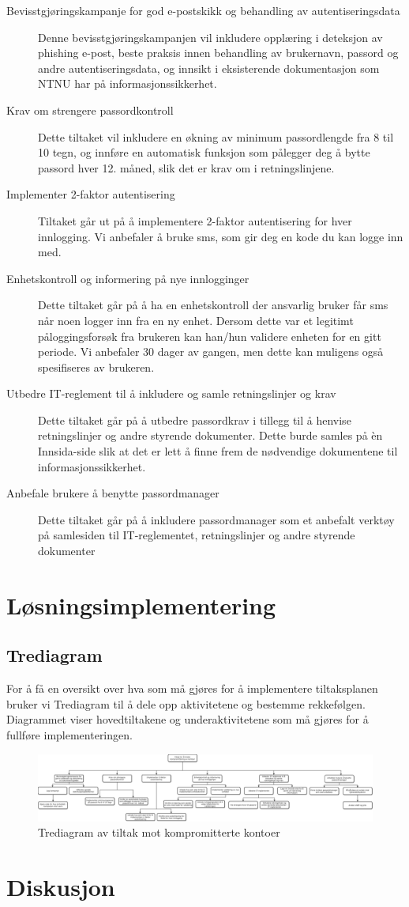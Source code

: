 \begin{description}
    \item[Bevisstgjøringskampanje for god e-postskikk og behandling av autentiseringsdata] Denne bevisstgjøringskampanjen vil inkludere opplæring i deteksjon av phishing e-post, beste praksis innen behandling av brukernavn, passord og andre autentiseringsdata, og innsikt i eksisterende dokumentasjon som NTNU har på informasjonssikkerhet. 
    \item[Krav om strengere passordkontroll] Dette tiltaket vil inkludere en økning av minimum passordlengde fra 8 til 10 tegn, og innføre en automatisk funksjon som pålegger deg å bytte passord hver 12. måned, slik det er krav om i retningslinjene. 
    \item[Implementer 2-faktor autentisering] Tiltaket går ut på å implementere 2-faktor autentisering for hver innlogging. Vi anbefaler å bruke sms, som gir deg en kode du kan logge inn med. 
    \item[Enhetskontroll og informering på nye innlogginger] Dette tiltaket går på å ha en enhetskontroll der ansvarlig bruker får sms når noen logger inn fra en ny enhet. Dersom dette var et legitimt påloggingsforsøk fra brukeren kan han/hun validere enheten for en gitt periode. Vi anbefaler 30 dager av gangen, men dette kan muligens også spesifiseres av brukeren. 
    \item[Utbedre IT-reglement til å inkludere og samle retningslinjer og krav] Dette tiltaket går på å utbedre passordkrav i tillegg til å henvise retningslinjer og andre styrende dokumenter. Dette burde samles på èn Innsida-side slik at det er lett å finne frem de nødvendige dokumentene til informasjonssikkerhet. 
    \item[Anbefale brukere å benytte passordmanager] Dette tiltaket går på å inkludere passordmanager som et anbefalt verktøy på samlesiden til IT-reglementet, retningslinjer og andre styrende dokumenter
\end{description}

\section{Løsningsimplementering}

\subsection{Trediagram}
For å få en oversikt over hva som må gjøres for å implementere tiltaksplanen bruker vi Trediagram til å dele opp aktivitetene og bestemme rekkefølgen. Diagrammet viser hovedtiltakene og underaktivitetene som må gjøres for å fullføre implementeringen. 

\begin{figure}[H] 
    \centering    
    \includegraphics[scale=0.4, angle=90]{case_2/bilder/trediagram.pdf}
    \caption[Trediagram av tiltak mot kompromitterte kontoer]{Trediagram av tiltak mot kompromitterte kontoer}
    \label{fig:trediagram-case2}
\end{figure}

\section{Diskusjon}

